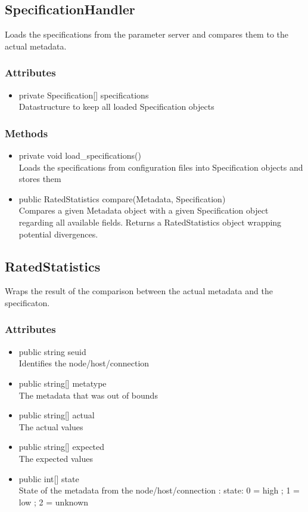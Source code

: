 \subsection{SpecificationHandler}
Loads the specifications from the parameter server and compares them to the actual metadata.

\subsubsection{Attributes}
\begin{itemize}
	\item private Specification[] specifications\\
	Datastructure to keep all loaded Specification objects
\end{itemize}
\subsubsection{Methods}
\begin{itemize}
	\item private void load\_specifications()\\
	Loads the specifications from configuration files into Specification objects and stores them
	\item public RatedStatistics compare(Metadata, Specification)\\
	Compares a given Metadata object with a given Specification object regarding all available fields. Returns a RatedStatistics object wrapping potential divergences.
\end{itemize}


\subsection{RatedStatistics}
Wraps the result of the comparison between the actual metadata and the specificaton.

\subsubsection{Attributes}
\begin{itemize}
	\item public string seuid\\
	Identifies the node/host/connection
	\item public string[] metatype\\
	The metadata that was out of bounds
	\item public string[] actual\\
	The actual values
	\item public string[] expected\\
	The expected values
	\item public int[] state\\
	State of the metadata from the node/host/connection : state: { 0 = high ; 1 = low ; 2 = unknown}
\end{itemize}


